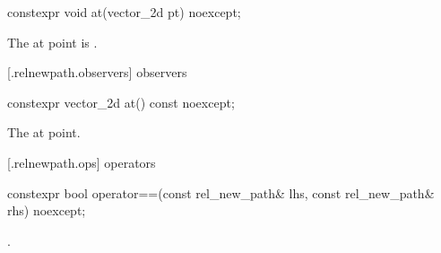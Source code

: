 %
\begin{itemdecl}
constexpr void at(vector_2d pt) noexcept;
\end{itemdecl}
\begin{itemdescr}
\pnum
\effects
The at point is .
\end{itemdescr}

 [\iotwod.relnewpath.observers]{ observers}%

%
\begin{itemdecl}
constexpr vector_2d at() const noexcept;
\end{itemdecl}
\begin{itemdescr}
\pnum
\returns
The at point.
\end{itemdescr}

 [\iotwod.relnewpath.ops]{ operators}%

%
\begin{itemdecl}
constexpr bool operator==(const rel_new_path& lhs, const rel_new_path& rhs) 
  noexcept;
\end{itemdecl}
\begin{itemdescr}
\pnum
\returns
{}.
\end{itemdescr}
